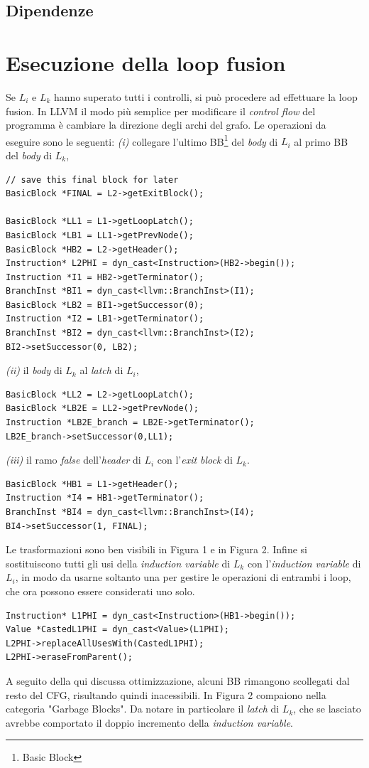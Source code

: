 \documentclass[letterpaper, 11pt]{article}
\begin{document}
\begin{multicols}{2}
\subsection{Dipendenze}
\label{sec:org4cf0af8}
\section{Esecuzione della loop fusion}
\label{sec:org267d6bf}
Se \(L_{i}\) e \(L_{k}\) hanno superato tutti i controlli, si può
procedere ad effettuare la loop fusion.
In LLVM il modo più semplice per modificare il \emph{control flow} del programma
è cambiare la direzione degli archi del grafo. Le operazioni da eseguire sono
le seguenti: \emph{(i)} collegare l'ultimo BB\footnote{Basic Block} del \emph{body} di \(L_{i}\) al
primo BB del \emph{body} di \(L_{k}\),
\footnotesize
\begin{verbatim}
// save this final block for later
BasicBlock *FINAL = L2->getExitBlock();

BasicBlock *LL1 = L1->getLoopLatch();
BasicBlock *LB1 = LL1->getPrevNode();
BasicBlock *HB2 = L2->getHeader();
Instruction* L2PHI = dyn_cast<Instruction>(HB2->begin());
Instruction *I1 = HB2->getTerminator();        
BranchInst *BI1 = dyn_cast<llvm::BranchInst>(I1);
BasicBlock *LB2 = BI1->getSuccessor(0);
Instruction *I2 = LB1->getTerminator();
BranchInst *BI2 = dyn_cast<llvm::BranchInst>(I2);
BI2->setSuccessor(0, LB2);
\end{verbatim}
\normalsize
 \emph{(ii)} il \emph{body} di \(L_{k}\) al \emph{latch} di \(L_{i}\),
\footnotesize
\begin{verbatim}
BasicBlock *LL2 = L2->getLoopLatch();
BasicBlock *LB2E = LL2->getPrevNode();
Instruction *LB2E_branch = LB2E->getTerminator();
LB2E_branch->setSuccessor(0,LL1);
\end{verbatim}
\normalsize
\emph{(iii)} il ramo \emph{false} dell'\emph{header} di \(L_{i}\) con l'\emph{exit block} di \(L_{k}\).
\footnotesize
\begin{verbatim}
BasicBlock *HB1 = L1->getHeader();
Instruction *I4 = HB1->getTerminator();
BranchInst *BI4 = dyn_cast<llvm::BranchInst>(I4);
BI4->setSuccessor(1, FINAL);
\end{verbatim}
\normalsize
Le trasformazioni sono ben visibili in Figura 1 e in Figura 2.
Infine si sostituiscono tutti gli usi della \emph{induction variable} di \(L_{k}\) con 
l'\emph{induction variable} di \(L_{i}\), in modo da usarne soltanto una per gestire le operazioni
di entrambi i loop, che ora possono essere considerati uno solo.
\newpage
\footnotesize
\begin{verbatim}
Instruction* L1PHI = dyn_cast<Instruction>(HB1->begin());
Value *CastedL1PHI = dyn_cast<Value>(L1PHI);
L2PHI->replaceAllUsesWith(CastedL1PHI);
L2PHI->eraseFromParent();
\end{verbatim}
\normalsize
A seguito della qui discussa ottimizzazione, alcuni BB rimangono scollegati dal resto del
CFG, risultando quindi inacessibili. In Figura 2 compaiono nella categoria "Garbage Blocks".
Da notare in particolare il \emph{latch} di \(L_{k}\), che se lasciato avrebbe comportato il
doppio incremento della \emph{induction variable}.
\newpage
\end{multicols}
\end{document}
